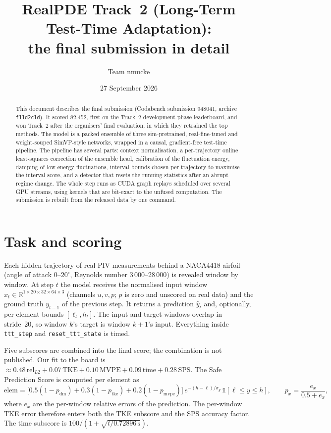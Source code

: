 \documentclass[10pt]{article}
\title{RealPDE Track~2 (Long-Term Test-Time Adaptation):\\ the final submission in detail}
\author{Team nmucke}
\date{27 September 2026}
\newcommand{\cfg}[1]{\texttt{#1}}
\begin{document}
\maketitle

\begin{abstract}
This document describes the final submission (Codabench submission 948041, archive \texttt{f11d2c1d}). It scored
82.452, first on the Track~2 development-phase leaderboard, and won Track~2 after the organisers' final evaluation,
in which they retrained the top methods. The model is a packed ensemble of three sim-pretrained, real-fine-tuned and weight-souped SimVP-style networks,
wrapped in a causal, gradient-free test-time pipeline. The pipeline has several parts: context normalisation,
a per-trajectory online least-squares correction of the ensemble head, calibration of the fluctuation energy,
damping of low-energy fluctuations, interval bounds chosen per trajectory to maximise the interval score, and a
detector that resets the running statistics after an abrupt regime change. The whole step runs as CUDA graph
replays scheduled over several GPU streams, using kernels that are bit-exact to the unfused computation. The
submission is rebuilt from the released data by one command.
\end{abstract}

\tableofcontents

\section{Task and scoring}

Each hidden trajectory of real PIV measurements behind a NACA4418 airfoil (angle of attack
$0$--$20^\circ$, Reynolds number $3\,000$--$28\,000$) is revealed window by window. At step $t$ the model
receives the normalised input window $x_t\in\mathbb{R}^{1\times20\times32\times64\times3}$ (channels
$u,v,p$; $p$ is zero and unscored on real data) and the ground truth $y_{t-1}$ of the previous step. It returns
a prediction $\hat y_t$ and, optionally, per-element bounds $[\ell_t,h_t]$. The input and target windows
overlap in stride~20, so window $k$'s target is window $k{+}1$'s input. Everything inside
\cfg{ttt\_step} and \cfg{reset\_ttt\_state} is timed.

Five subscores are combined into the final score; the combination is not published. Our fit to the board is
$\approx 0.48\,\text{rel}_{L2} + 0.07\,\text{TKE} + 0.10\,\text{MVPE} + 0.09\,\text{time} + 0.28\,\text{SPS}$.
The Safe Prediction Score is computed per element as
\begin{equation}
  \text{elem}=\bigl[0.5(1-p_{\text{dm}})+0.3(1-p_{\text{tke}})+0.2(1-p_{\text{mvpe}})\bigr]\,
  e^{-(h-\ell)/\sigma_g}\,\mathbb{1}[\ell\le y\le h],\qquad p_x=\frac{e_x}{0.5+e_x},
\end{equation}
where $e_x$ are the per-window relative errors of the prediction. The per-window TKE error therefore enters
both the TKE subscore and the SPS accuracy factor. The time subscore is $100/(1+\sqrt{t/0.72896\,\text{s}})$.
\end{document}
